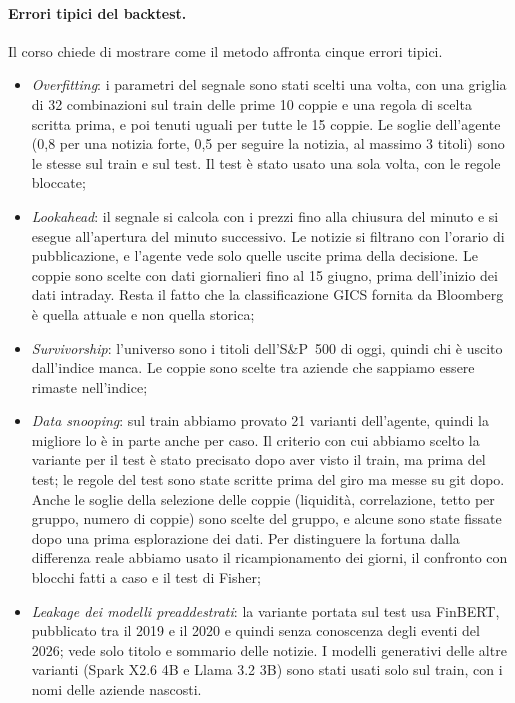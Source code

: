 \documentclass[11pt,a4paper]{article}
\begin{document}
\paragraph{Errori tipici del backtest.} Il corso chiede di mostrare come il metodo affronta cinque errori tipici.
\begin{itemize}
  \item \emph{Overfitting}: i parametri del segnale sono stati scelti una volta, con una griglia di 32 combinazioni sul train delle prime 10 coppie e una regola di scelta scritta prima, e poi tenuti uguali per tutte le 15 coppie. Le soglie dell'agente (0,8 per una notizia forte, 0,5 per seguire la notizia, al massimo 3 titoli) sono le stesse sul train e sul test. Il test è stato usato una sola volta, con le regole bloccate;
  \item \emph{Lookahead}: il segnale si calcola con i prezzi fino alla chiusura del minuto e si esegue all'apertura del minuto successivo. Le notizie si filtrano con l'orario di pubblicazione, e l'agente vede solo quelle uscite prima della decisione. Le coppie sono scelte con dati giornalieri fino al 15 giugno, prima dell'inizio dei dati intraday. Resta il fatto che la classificazione GICS fornita da Bloomberg è quella attuale e non quella storica;
  \item \emph{Survivorship}: l'universo sono i titoli dell'S\&P~500 di oggi, quindi chi è uscito dall'indice manca. Le coppie sono scelte tra aziende che sappiamo essere rimaste nell'indice;
  \item \emph{Data snooping}: sul train abbiamo provato 21 varianti dell'agente, quindi la migliore lo è in parte anche per caso. Il criterio con cui abbiamo scelto la variante per il test è stato precisato dopo aver visto il train, ma prima del test; le regole del test sono state scritte prima del giro ma messe su git dopo. Anche le soglie della selezione delle coppie (liquidità, correlazione, tetto per gruppo, numero di coppie) sono scelte del gruppo, e alcune sono state fissate dopo una prima esplorazione dei dati. Per distinguere la fortuna dalla differenza reale abbiamo usato il ricampionamento dei giorni, il confronto con blocchi fatti a caso e il test di Fisher;
  \item \emph{Leakage dei modelli preaddestrati}: la variante portata sul test usa FinBERT, pubblicato tra il 2019 e il 2020 e quindi senza conoscenza degli eventi del 2026; vede solo titolo e sommario delle notizie. I modelli generativi delle altre varianti (Spark X2.6 4B e Llama 3.2 3B) sono stati usati solo sul train, con i nomi delle aziende nascosti.
\end{itemize}
\end{document}
